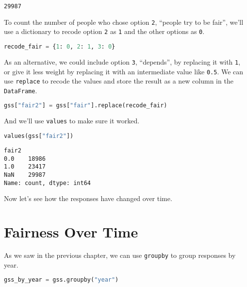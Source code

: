 \begin{lstlisting}[style=output]
29987
\end{lstlisting}

To count the number of people who chose option
\passthrough{\lstinline!2!}, ``people try to be fair'', we'll use a
dictionary to recode option \passthrough{\lstinline!2!} as
\passthrough{\lstinline!1!} and the other options as
\passthrough{\lstinline!0!}.

\begin{lstlisting}[language=Python,style=source]
recode_fair = {1: 0, 2: 1, 3: 0}
\end{lstlisting}

As an alternative, we could include option \passthrough{\lstinline!3!},
``depends'', by replacing it with \passthrough{\lstinline!1!}, or give
it less weight by replacing it with an intermediate value like
\passthrough{\lstinline!0.5!}. We can use
\passthrough{\lstinline!replace!} to recode the values and store the
result as a new column in the \passthrough{\lstinline!DataFrame!}.

\begin{lstlisting}[language=Python,style=source]
gss["fair2"] = gss["fair"].replace(recode_fair)
\end{lstlisting}

And we'll use \passthrough{\lstinline!values!} to make sure it worked.

\begin{lstlisting}[language=Python,style=source]
values(gss["fair2"])
\end{lstlisting}

\begin{lstlisting}[style=output]
fair2
0.0    18986
1.0    23417
NaN    29987
Name: count, dtype: int64
\end{lstlisting}

Now let's see how the responses have changed over time.

\section{Fairness Over Time}\label{fairness-over-time}

As we saw in the previous chapter, we can use
\passthrough{\lstinline!groupby!} to group responses by year.

\begin{lstlisting}[language=Python,style=source]
gss_by_year = gss.groupby("year")
\end{lstlisting}

